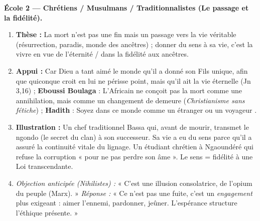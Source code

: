 \documentclass[11pt]{article}
\newcommand{\cle}[1]{{\popxbold\color{popdark}#1}}
\begin{document}
\begin{exoresolu}
\textbf{École 2 — Chrétiens / Musulmans / Traditionnalistes (Le passage et la fidélité).}
\begin{enumerate}
    \item \textbf{Thèse :} La mort n'est pas une fin mais un passage vers la vie véritable (résurrection, paradis, monde des ancêtres) ; donner du sens à sa vie, c'est la vivre en vue de l'éternité / dans la fidélité aux ancêtres.
    \item \textbf{Appui :} \guillemotleft Car Dieu a tant aimé le monde qu'il a donné son Fils unique, afin que quiconque croit en lui ne périsse point, mais qu'il ait la vie éternelle \guillemotright (Jn 3,16) ; \textbf{Eboussi Boulaga} : \guillemotleft L'Africain ne conçoit pas la mort comme une annihilation, mais comme un changement de demeure \guillemotright (\emph{Christianisme sans fétiche}) ; \textbf{Hadith} : \guillemotleft Soyez dans ce monde comme un étranger ou un voyageur \guillemotright.
    \item \textbf{Illustration :} Un chef traditionnel Bassa qui, avant de mourir, transmet le \cle{ngondo} (le secret du clan) à son successeur. Sa vie a eu du sens parce qu'il a assuré la \cle{continuité vitale} du lignage. Un étudiant chrétien à Ngaoundéré qui refuse la corruption « pour ne pas perdre son âme ». Le sens = \cle{fidélité} à une Loi transcendante.
    \item \textit{Objection anticipée (Nihilistes) :} « C'est une illusion consolatrice, de l'opium du peuple (Marx). » \textit{Réponse :} « Ce n'est pas une fuite, c'est un \emph{engagement} plus exigeant : aimer l'ennemi, pardonner, jeûner. L'espérance structure l'éthique présente. »
\end{enumerate}


\end{exoresolu}
\end{document}
